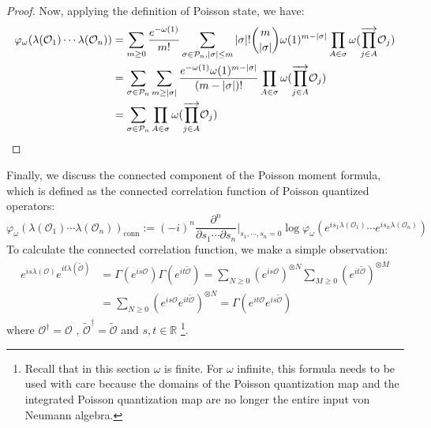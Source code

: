 \documentclass[a4paper,11pt]{article}
\theoremstyle{definition}
\numberwithin{equation}{section}
\begin{document}
\begin{proof}
    Now, applying the definition of Poisson state, we have:
    \begin{align}
        \begin{split}
            \varphi_\omega(\lambda(\mathcal{O}_1)\cdots\lambda(\mathcal{O}_n)) &= \sum_{m\geq 0}\frac{e^{-\omega(1)}}{m!}\sum_{\sigma\in\mathcal{P}_n, |\sigma|\leq m}|\sigma|!\binom{m}{|\sigma|}\omega(1)^{m - |\sigma|}\prod_{A\in\sigma}\omega(\overrightarrow{\prod_{j\in A}}\mathcal{O}_j)
            \\
            &=\sum_{\sigma\in\mathcal{P}_n}\sum_{m\geq |\sigma|}\frac{e^{-\omega(1)}\omega(1)^{m - |\sigma|}}{(m - |\sigma|)!}\prod_{A\in\sigma}\omega(\overrightarrow{\prod_{j\in A}}\mathcal{O}_j)
            \\
            &=\sum_{\sigma\in\mathcal{P}_n}\prod_{A\in\sigma}\omega(\overrightarrow{\prod_{j\in A}}\mathcal{O}_j)\qedhere
        \end{split}
    \end{align}
\end{proof}
Finally, we discuss the connected component of the Poisson moment formula, which is defined as the connected correlation function of Poisson quantized operators: 
\begin{equation}
    \varphi_\omega(\lambda(\mathcal{O}_1)\cdots\lambda(\mathcal{O}_n))_\text{conn} := (-i)^n\frac{\partial^n}{\partial s_1\cdots\partial s_n}|_{s_1,\cdots,s_n = 0}\log\varphi_\omega(e^{is_1\lambda(\mathcal{O}_1)}\cdots e^{is_n\lambda(\mathcal{O}_n)})
\end{equation}
To calculate the connected correlation function, we make a simple observation:
\begin{align}
    \begin{split}
        e^{is\lambda(\mathcal{O})}e^{it\lambda(\widetilde{\mathcal{O}})} &= \Gamma(e^{is\mathcal{O}})\Gamma(e^{it\widetilde{\mathcal{O}}}) = \sum_{N\geq 0}(e^{is\mathcal{O}})^{\otimes N} \sum_{M\geq 0}(e^{it\widetilde{\mathcal{O}}})^{\otimes M} \\&= \sum_{N\geq 0}(e^{is\mathcal{O}}e^{it\widetilde{\mathcal{O}}})^{\otimes N} = \Gamma(e^{it\mathcal{O}}e^{is\widetilde{\mathcal{O}}})
    \end{split}
\end{align}
where $\mathcal{O}^\dagger = \mathcal{O}\text{ , }\widetilde{\mathcal{O}}^\dagger = \widetilde{\mathcal{O}}$ and $s,t\in\mathbb{R}$ \footnote{Recall that in this section $\omega$ is finite. For $\omega$ infinite, this formula needs to be used with care because the domains of the Poisson quantization map and the integrated Poisson quantization map are no longer the entire input von Neumann algebra.}.
\end{document}
